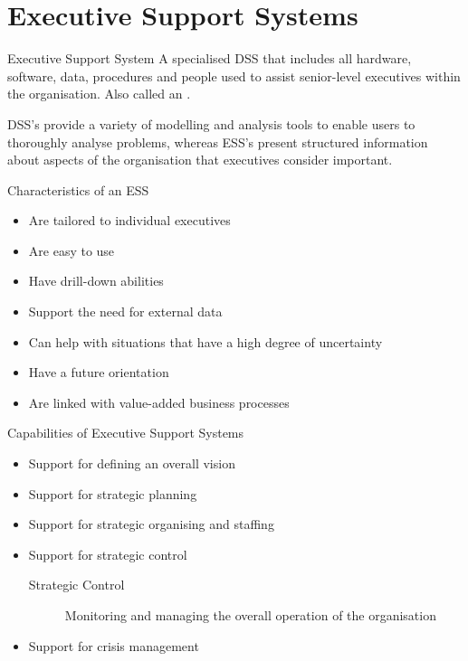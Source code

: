 \documentclass[\main/notes.tex]{subfiles}
\begin{document}
		\section{Executive Support Systems}
			\begin{definition}{Executive Support System}
				A specialised DSS that includes all hardware, software, data, procedures and people used to assist senior-level executives within the organisation. Also called an .

				DSS's provide a variety of modelling and analysis tools to enable users to thoroughly analyse problems, whereas ESS's present structured information about aspects of the organisation that executives consider important.
			\end{definition}
			\begin{sidenote}{Characteristics of an ESS}
				\begin{itemize}[nosep]
					\item Are tailored to individual executives
					\item Are easy to use
					\item Have drill-down abilities
					\item Support the need for external data
					\item Can help with situations that have a high degree of uncertainty
					\item Have a future orientation
					\item Are linked with value-added business processes
				\end{itemize}
			\end{sidenote}
			\begin{sidenote}{Capabilities of Executive Support Systems}
				\begin{itemize}[nosep]
					\item Support for defining an overall vision
					\item Support for strategic planning
					\item Support for strategic organising and staffing
					\item Support for strategic control
						\begin{description}
							\item[Strategic Control] Monitoring and managing the overall operation of the organisation
						\end{description}
					\item Support for crisis management
				\end{itemize}
			\end{sidenote}

	\vbox{}
\end{document}
